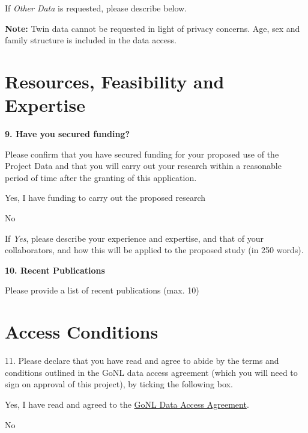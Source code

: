 \documentclass[a4paper,12pt]{article}
\begin{document}
\begin{Form}
If \emph{Other Data} is requested, please describe below.

\TextField[name=otherDataDescription,multiline=true,height=12\baselineskip]{}

\textbf{Note:} Twin data cannot be requested in light of privacy concerns. Age, sex and family structure is included in the data access.

\section*{Resources, Feasibility and Expertise}

\textbf{9. Have you secured funding?}

Please confirm that you have secured funding for your proposed use of the Project Data and that you will carry out your research within a reasonable period of time after the granting of this application.

 Yes, I have funding to carry out the proposed research

 No

If \emph{Yes}, please describe your experience and expertise, and that of your collaborators, and how this will be applied to the proposed study (in 250 words).

\TextField[name=resourcesExperience,multiline=true,height=9\baselineskip]{}

\vspace{10mm}

\textbf{10. Recent Publications}

Please provide a list of recent publications (max. 10)

\TextField[name=publications,multiline=true,height=38\baselineskip]{}

\section*{Access Conditions}

11. Please declare that you have read and agree to abide by the terms and conditions outlined in the GoNL data access agreement (which you will need to sign on approval of this project), by ticking the following box.

 Yes, I have read and agreed to the \href{https://go-nl.molgeniscloud.org/api/files/aaaac5wx7sgqv6qwh32jd7yaai?alt=media}{GoNL Data Access Agreement}.

 No

\end{Form}
\end{document}
